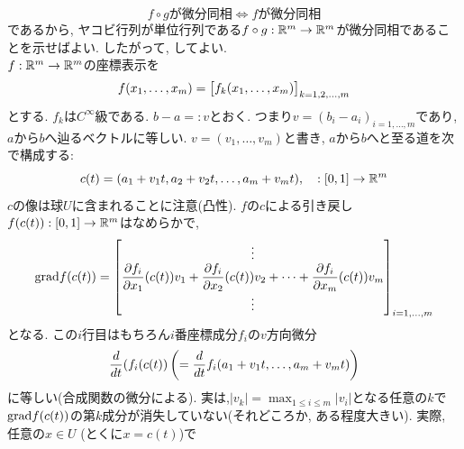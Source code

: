 \[f\circ gが微分同相 \iff fが微分同相\]
であるから, ヤコビ行列が単位行列である$f\circ g:\mathbb{R}^m\to \mathbb{R}^m$が微分同相であることを示せばよい. したがって, してよい.
{\small
{}
}
 \\
$f:\mathbb{R}^m\to \mathbb{R}^m$の座標表示を
\[f(x_1,\dots, x_m) = \begin{bmatrix}f_k(x_1,\dots, x_m)\end{bmatrix}_{k=1,2,\dots, m}\]
とする. $f_k$は$C^{\infty}$級である.
\prf $b-a =: v$とおく. つまり$v = (b_i - a_i)_{i=1,\dots, m}$であり, $a$から$b$へ辿るベクトルに等しい.  $v=(v_1,\dots, v_m)$と書き, $a$から$b$へと至る道を次で構成する:
\[c(t) = (a_1 + v_1t, a_2+v_2t, \dots, a_m + v_mt),\quad :[0,1]\to \mathbb{R}^m\]
$c$の像は球$U$に含まれることに注意(凸性). $f$の$c$による引き戻し$f(c(t)):[0,1]\to \mathbb{R}^m$はなめらかで, {\small
\[\mathrm{grad}f(c(t)) = \begin{bmatrix} \vdots \\
 \dfrac{\partial f_i}{\partial x_1}(c(t))v_1 + \dfrac{\partial f_i}{\partial x_2}(c(t))v_2 + \dots + \dfrac{\partial f_i}{\partial x_m}(c(t))v_m\\
 \vdots \\
\end{bmatrix}_{i=1,\dots, m}\]
}
となる. この$i$行目はもちろん$i$番座標成分$f_i$の$v$方向微分
\[\dfrac{d}{dt}(f_i(c(t))  \left(  =\dfrac{d}{dt}f_i(a_1+v_1t, \dots, a_m + v_mt)  \right)\]
に等しい(合成関数の微分による). 実は,$|v_k| = \max_{1\leq i\leq m} |v_i|$となる任意の$k$で$\mathrm{grad}f(c(t))$の第$k$成分が消失していない(それどころか, ある程度大きい). 実際, 任意の$x\in U$ (とくに$x=c(t)$)で
